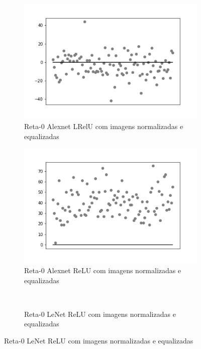 \begin{figure}[hb!]
	\caption{Redes neurais biológicas.}
	\begin{subfigure}[hb]{0.5\linewidth}
		\caption{Reta-0 Alexnet LRelU com imagens normalizadas e equalizadas}
		\label{fig:histalexlrelunorm}
		\includegraphics[width=\linewidth]{img/graficos-fase2/fig-reta-0-alexnet-lrelu-data-augmentation-2-2.png}
	\end{subfigure}%
	\begin{subfigure}[hb]{0.5\linewidth}
		\caption{Reta-0 Alexnet ReLU com imagens normalizadas e equalizadas}
		\label{fig:redeneuralbiologica}
		\includegraphics[width=\linewidth]{img/graficos-fase2/fig-reta-0-alexnet-relu-data-augmentation-2-1.png}
	\end{subfigure}\\
  \begin{subfigure}[hb]{0.5\linewidth}
    \caption{Reta-0 LeNet ReLU com imagens normalizadas e equalizadas}

\end{subfigure}
\end{figure}
